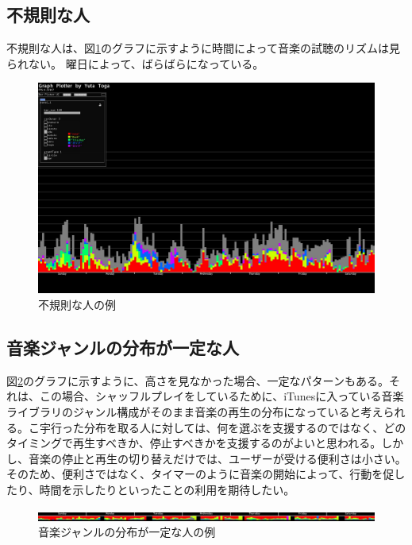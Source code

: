 \documentclass{jsarticle}
\begin{document}
\subsection{不規則な人}
不規則な人は、図\ref{sample_irregular}のグラフに示すように時間によって音楽の試聴のリズムは見られない。
曜日によって、ばらばらになっている。

\begin{figure}[h]
\begin{center}
\includegraphics[width=14cm]{sample_irregular.jpg}
\caption{不規則な人の例}
\label{sample_irregular}
\end{center}
\end{figure}

\subsection{音楽ジャンルの分布が一定な人}
図\ref{genreMap_regular}のグラフに示すように、高さを見なかった場合、一定なパターンもある。それは、この場合、シャッフルプレイをしているために、iTunesに入っている音楽ライブラリのジャンル構成がそのまま音楽の再生の分布になっていると考えられる。こ宇行った分布を取る人に対しては、何を選ぶを支援するのではなく、どのタイミングで再生すべきか、停止すべきかを支援するのがよいと思われる。しかし、音楽の停止と再生の切り替えだけでは、ユーザーが受ける便利さは小さい。そのため、便利さではなく、タイマーのように音楽の開始によって、行動を促したり、時間を示したりといったことの利用を期待したい。

\begin{figure}[h]
\begin{center}
\includegraphics[width=14cm]{genreMap_regular.jpg}
\caption{音楽ジャンルの分布が一定な人の例}
\label{genreMap_regular}
\end{center}
\end{figure}
\end{document}
